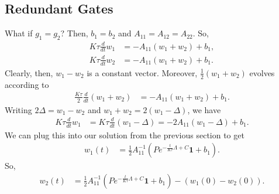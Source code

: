 \documentclass{article}
\begin{document}
\subsection{Redundant Gates}
What if $g_1 = g_2$?
Then, $b_1 = b_2$ and $A_{11} = A_{12} = A_{22}$.
So,
\begin{align}
  K \tau \frac{d}{dt} w_1 &= - A_{11} (w_1 + w_2) + b_1 , \\
  K \tau \frac{d}{dt} w_2 &= - A_{11} (w_1 + w_2) + b_1 .
\end{align}
Clearly, then, $w_1 - w_2$ is a constant vector.
Moreover, $\frac{1}{2} (w_1 + w_2)$ evolves according to
\begin{align}
  \frac{K \tau}{2} \frac{d}{dt} (w_1 + w_2) &= - A_{11} (w_1 + w_2) + b_1.
\end{align}
Writing $2 \Delta = w_1 - w_2$ and $w_1 + w_2 = 2 (w_1 - \Delta)$, we have
\begin{align}
  K \tau \frac{d}{dt} w_1
  &= K \tau \frac{d}{dt} (w_1 - \Delta)
  = - 2 A_{11} (w_1 - \Delta) + b_1.
\end{align}
We can plug this into our solution from the previous section to get
\begin{align}
  w_1(t) &= \frac{1}{2} A_{11}^{-1} \left( P e^{-\frac{t}{K \tau} \Lambda + C} \mathbf{1} + b_1 \right).
\end{align}
So,
\begin{align}
  w_2(t) &= \frac{1}{2} A_{11}^{-1} \left( P e^{-\frac{t}{K \tau} \Lambda + C} \mathbf{1} + b_1 \right) - (w_1(0) - w_2(0)).
\end{align}



\end{document}
